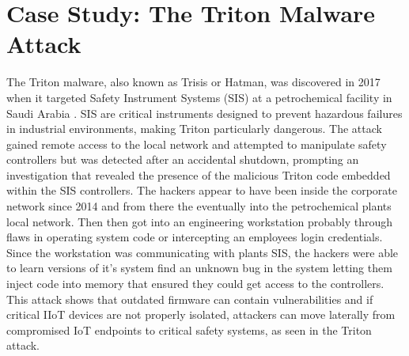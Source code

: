 \documentclass[article,a4paper]{IEEEtran}
\begin{document}
\section{ Case Study: The Triton Malware Attack}
The Triton malware, also known as Trisis or Hatman, was discovered in 2017 when it targeted Safety Instrument Systems (SIS) at a petrochemical facility in Saudi Arabia \cite{Triton,Triton2}. SIS are critical instruments designed to prevent hazardous failures in industrial environments, making Triton particularly dangerous. The attack gained remote access to the local network and attempted to manipulate safety controllers but was detected after an accidental shutdown, prompting an investigation that revealed the presence of the malicious Triton code embedded within the SIS controllers. 
\newline\newline
The hackers appear to have been inside the corporate network since 2014 and from there the eventually into the petrochemical plants local network. Then then got into an engineering workstation probably through flaws in operating system code or intercepting an employees login credentials. Since the workstation was communicating with plants SIS, the hackers were able to learn versions of it's system find an unknown bug in the system letting them inject code into memory that ensured they could get access to the controllers. 
\newline\newline
This attack shows that outdated firmware can contain vulnerabilities and if critical IIoT devices are not properly isolated, attackers can move laterally from compromised IoT endpoints to critical safety systems, as seen in the Triton attack. 
\end{document}
